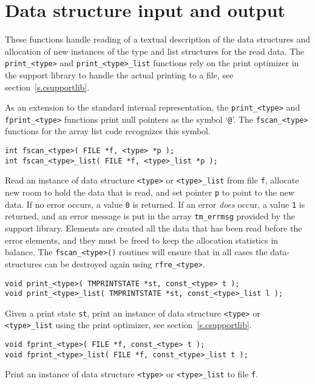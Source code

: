 \section{Data structure input and output}
These functions handle reading of a textual description of the data structures
and allocation of new instances of the type and list structures for the
read data.
The {\tt print\_<type>} and {\tt print\_<type>\_list} functions rely on the
print optimizer in the
{\C} support library to handle the actual printing to a file,
see section~\ref{s.csupportlib}.
\par
\begin{sloppypar}
As an extension to the standard {\Tm} internal representation,
the \verb!print_<type>! and \verb'fprint_<type>' functions print null
pointers as the symbol `{\tt @}'.
The \verb+fscan_<type>+ functions for the array list code recognizes
this symbol.
\end{sloppypar}
\begin{verbatim}
int fscan_<type>( FILE *f, <type> *p );
int fscan_<type>_list( FILE *f, <type>_list *p );
\end{verbatim}
\begin{desc}
Read an instance of data structure {\tt <type>} or {\tt <type>\_list}
from file {\tt f},
allocate new room to hold the data that is read,
and set pointer {\tt p} to point to the new data.
If no error occurs, a value {\tt 0} is returned.
If an error {\em does} occur,
a value {\tt 1} is returned, and an error message is put in the array
{\tt tm\_errmsg} provided by the {\C} support library.
Elements are created all the data that has been read before the error elements,
and they must be freed to keep the allocation statistics in balance.
The \verb+fscan_<type>()+ routines will ensure that in all cases the
data-structures can be destroyed again using \verb+rfre_<type>+.
\end{desc}
\begin{verbatim}
void print_<type>( TMPRINTSTATE *st, const_<type> t );
void print_<type>_list( TMPRINTSTATE *st, const_<type>_list l );
\end{verbatim}
\begin{desc}
Given a print state {\tt st},
print an instance of data structure {\tt <type>} or {\tt <type>\_list}
using the print optimizer, see section~\ref{s.csupportlib}.
\end{desc}
\begin{verbatim}
void fprint_<type>( FILE *f, const_<type> t );
void fprint_<type>_list( FILE *f, const_<type>_list t );
\end{verbatim}
\begin{desc}
Print an instance of data structure {\tt <type>} or {\tt <type>\_list}
to file {\tt f}.
\end{desc}
